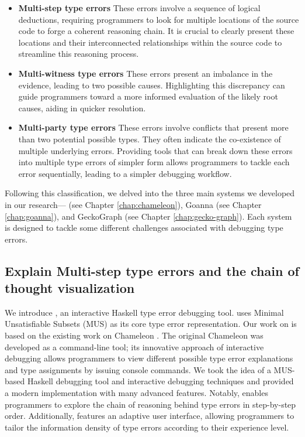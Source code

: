 \begin{itemize}
    \item {\textbf{Multi-step type errors} These errors involve a sequence of logical deductions, requiring programmers to look for multiple locations of the source code to forge a coherent reasoning chain. It is crucial to clearly present these locations and their interconnected relationships within the source code to streamline this reasoning process.}
    \item{\textbf{Multi-witness type errors}  These errors present an imbalance in the evidence, leading to two possible causes. Highlighting this discrepancy can guide programmers toward a more informed evaluation of the likely root causes, aiding in quicker resolution.}
    \item{\textbf{Multi-party type errors} These errors involve conflicts that present more than two potential possible types. They often indicate the co-existence of multiple underlying errors. Providing tools that can break down these errors into multiple type errors of simpler form allows programmers to tackle each error sequentially, leading to a simpler debugging workflow.}
\end{itemize}


Following this classification, we delved into the three main systems we developed in our research—\chameleon{} (see Chapter \ref{chap:chameleon}), Goanna (see Chapter \ref{chap:goanna}), and GeckoGraph (see Chapter \ref{chap:gecko-graph}). Each system is designed to tackle some different challenges associated with debugging type errors.

\subsection{Explain Multi-step type errors and the chain of thought visualization}


We introduce \textbf{\chameleon{}}, an interactive Haskell type error debugging tool. \chameleon{} uses Minimal Unsatisfiable Subsets (MUS) as its core type error representation. Our work on \chameleon{} is based on the existing work on Chameleon \cite{Stuckey2003-pz, Wazny2006-ll}. The original Chameleon was developed as a command-line tool; its innovative approach of interactive debugging allows programmers to view different possible type error explanations and type assignments by issuing console commands.  We took the idea of a MUS-based Haskell debugging tool and interactive debugging techniques and provided a modern implementation with many advanced features. Notably, \chameleon{} enables programmers to explore the chain of reasoning behind type errors in step-by-step order. Additionally, \chameleon{} features an adaptive user interface, allowing programmers to tailor the information density of type errors according to their experience level.


